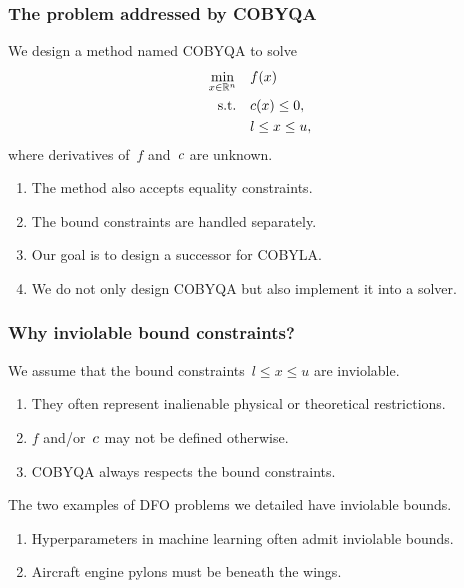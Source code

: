 \documentclass{polyu-presentation}
\newcommand{\con}[1][]{c\ifthenelse{\equal{#1}{}}{}{_{#1}}}
\newcommand{\obj}{f}
\newcommand{\xl}{l}
\newcommand{\xu}{u}
\begin{document}
\begin{frame}
    \frametitle{The problem addressed by COBYQA}
    
	We design a method named \alert{COBYQA} to solve
    \begin{align*}
        \min_{x \in \R^n}   & \quad \obj(x)\\
        \text{s.t.}         & \quad \con(x) \le 0,\\
                            & \quad \xl \le x \le \xu,
    \end{align*}
    where derivatives of~$\obj$ and~$\con$ are \alert{unknown}.

    \bigskip

    \begin{block}{}
        \begin{enumerate}
            \item The method also accepts \alert{equality constraints}.
            \item The bound constraints are handled separately.
            \item Our goal is to design a \alert{successor} for COBYLA.
            \item We do not only design COBYQA but also \alert{implement} it into a solver.
        \end{enumerate}
    \end{block}
\end{frame}

\begin{frame}
    \frametitle{Why inviolable bound constraints?}
    
	\begin{block}{}
        We assume that the bound constraints~$\xl \le x \le \xu$ are \alert{inviolable}.
        \begin{enumerate}
            \item They often represent inalienable physical or theoretical restrictions.
            \item $f$ and/or~$\con$ may \alert{not} be defined otherwise.
            \item COBYQA \alert{always} respects the bound constraints.
        \end{enumerate}
    \end{block}

    \bigskip

    The two examples of DFO problems we detailed have inviolable bounds.
    \begin{enumerate}
        \item Hyperparameters in machine learning often admit inviolable bounds.
        \item Aircraft engine pylons must be beneath the wings.
    \end{enumerate}
\end{frame}
\end{document}
